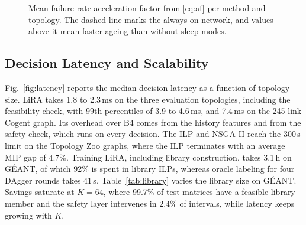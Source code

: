 \documentclass[journal]{IEEEtran}
\begin{document}
\begin{figure}[t]
\centering
{}
\caption{Mean failure-rate acceleration factor from \eqref{eq:af} per method and topology. The dashed line marks the always-on network, and values above it mean faster ageing than without sleep modes.}
\label{fig:af}
\end{figure}

\subsection{Decision Latency and Scalability}

Fig.~\ref{fig:latency} reports the median decision latency as a function of topology size. LiRA takes 1.8 to 2.3\,ms on the three evaluation topologies, including the feasibility check, with 99th percentiles of 3.9 to 4.6\,ms, and 7.4\,ms on the 245-link Cogent graph. Its overhead over B4 comes from the history features and from the safety check, which runs on every decision. The ILP and NSGA-II reach the 300\,s limit on the Topology Zoo graphs, where the ILP terminates with an average MIP gap of 4.7\%. Training LiRA, including library construction, takes 3.1\,h on G\'{E}ANT, of which 92\% is spent in library ILPs, whereas oracle labeling for four DAgger rounds takes 41\,s. Table~\ref{tab:library} varies the library size on G\'{E}ANT. Savings saturate at $K=64$, where 99.7\% of test matrices have a feasible library member and the safety layer intervenes in 2.4\% of intervals, while latency keeps growing with $K$.
\end{document}
